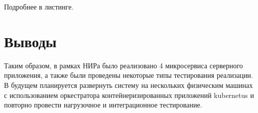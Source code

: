 Подробнее в листинге.





\section{Выводы}
Таким образом, в рамках НИРа было реализовано 4 микросервиса серверного приложения, а также были проведены некоторые типы тестирования реализации. 
В будущем планируется развернуть систему на нескольких физическим машинах с использованием оркестратора контейнеризированных приложений 
kubernetus и повторно провести нагрузочное и интеграционное тестирование.




